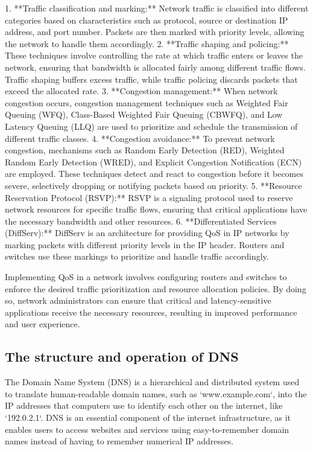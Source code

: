 \documentclass{article}
\begin{document}
1. **Traffic classification and marking:** Network traffic is classified into different categories based on characteristics such as protocol, source or destination IP address, and port number. Packets are then marked with priority levels, allowing the network to handle them accordingly.
2. **Traffic shaping and policing:** These techniques involve controlling the rate at which traffic enters or leaves the network, ensuring that bandwidth is allocated fairly among different traffic flows. Traffic shaping buffers excess traffic, while traffic policing discards packets that exceed the allocated rate.
3. **Congestion management:** When network congestion occurs, congestion management techniques such as Weighted Fair Queuing (WFQ), Class-Based Weighted Fair Queuing (CBWFQ), and Low Latency Queuing (LLQ) are used to prioritize and schedule the transmission of different traffic classes.
4. **Congestion avoidance:** To prevent network congestion, mechanisms such as Random Early Detection (RED), Weighted Random Early Detection (WRED), and Explicit Congestion Notification (ECN) are employed. These techniques detect and react to congestion before it becomes severe, selectively dropping or notifying packets based on priority.
5. **Resource Reservation Protocol (RSVP):** RSVP is a signaling protocol used to reserve network resources for specific traffic flows, ensuring that critical applications have the necessary bandwidth and other resources.
6. **Differentiated Services (DiffServ):** DiffServ is an architecture for providing QoS in IP networks by marking packets with different priority levels in the IP header. Routers and switches use these markings to prioritize and handle traffic accordingly.

Implementing QoS in a network involves configuring routers and switches to enforce the desired traffic prioritization and resource allocation policies. By doing so, network administrators can ensure that critical and latency-sensitive applications receive the necessary resources, resulting in improved performance and user experience.


\subsection{The structure and operation of DNS}

The Domain Name System (DNS) is a hierarchical and distributed system used to translate human-readable domain names, such as `www.example.com`, into the IP addresses that computers use to identify each other on the internet, like `192.0.2.1`. DNS is an essential component of the internet infrastructure, as it enables users to access websites and services using easy-to-remember domain names instead of having to remember numerical IP addresses.
\end{document}
